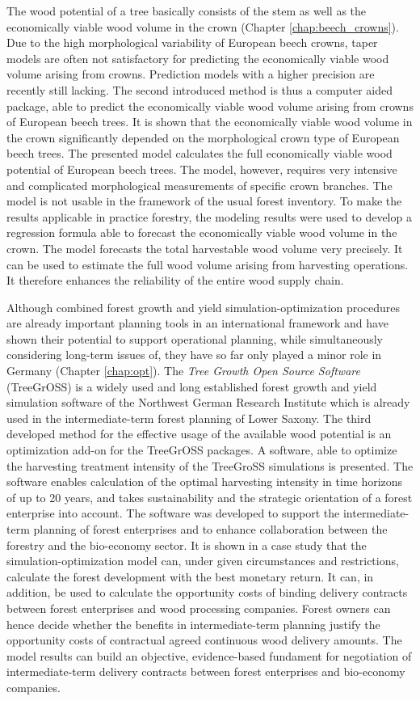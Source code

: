 The wood potential of a tree basically consists of the stem as well as the economically viable wood volume in the crown (Chapter \ref{chap:beech_crowns}). Due to the high morphological variability of European beech crowns, taper models are often not satisfactory for predicting the economically viable wood volume arising from crowns. Prediction models with a higher precision are recently still lacking. The second introduced method is thus a computer aided package, able to predict the economically viable wood volume arising from crowns of European beech trees. It is shown that the economically viable wood volume in the crown significantly depended on the morphological crown type of European beech trees. The presented model calculates the full economically viable wood potential of European beech trees. The model, however, requires very intensive and complicated morphological measurements of specific crown branches. The model is not usable in the framework of the usual forest inventory. To make the results applicable in practice forestry, the modeling results were used to develop a regression formula able to forecast the economically viable wood volume in the crown. The model forecasts the total harvestable wood volume very precisely. It can be used to estimate the full wood volume arising from harvesting operations. It therefore enhances the reliability of the entire wood supply chain.

Although combined forest growth and yield si\-mu\-la\-tion-op\-ti\-mi\-za\-tion procedures are already important planning tools in an international framework and have shown their potential to support operational planning, while simultaneously considering long-term issues of, they have so far only played a minor role in Germany (Chapter \ref{chap:opt}). The \textit{Tree Growth Open Source Software} (TreeGrOSS) is a widely used and long established forest growth and yield simulation software of the Northwest German Research Institute which is already used in the intermediate-term forest planning of Lower Saxony. The third developed method for the effective usage of the available wood potential is an optimization add-on for the TreeGrOSS packages. A software, able to optimize the harvesting treatment intensity of the TreeGroSS simulations is presented. The software enables calculation of the optimal harvesting intensity in time horizons of up to 20 years, and takes sustainability and the strategic orientation of a forest enterprise into account. The software was developed to support the intermediate-term planning of forest enterprises and to enhance collaboration between the forestry and the bio-economy sector. It is shown in a case study that the si\-mu\-la\-tion-op\-ti\-mi\-za\-tion model can, under given circumstances and restrictions, calculate the forest development with the best monetary return. It can, in addition, be used to calculate the opportunity costs of binding delivery contracts between forest enterprises and wood processing companies. Forest owners can hence decide whether the benefits in intermediate-term planning justify the opportunity costs of contractual agreed continuous wood delivery amounts. The model results can build an objective, evidence-based fundament for negotiation of intermediate-term delivery contracts between forest enterprises and bio-economy companies.